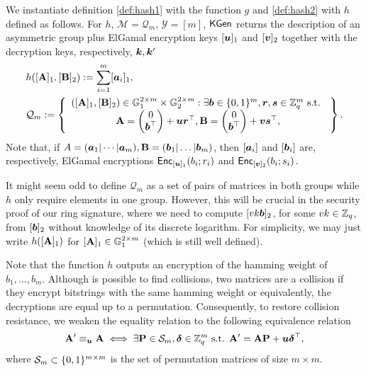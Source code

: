 
We instantiate definition \ref{def:hash1} with the function $g$ and \ref{def:hash2}  with $h$ defined as follows. For  $h$, $\mathcal{M}=\mathcal{Q}_m$, $\mathcal{Y}=[m]$, $\mathsf{KGen}$ returns the description of an asymmetric group plus ElGamal encryption keys $[{\boldsymbol{u}}]_1$  and $[{\boldsymbol{v}}]_2$ together with the decryption keys, respectively, ${\boldsymbol{k}},{\boldsymbol{k}}'$ 
\begin{align*}
&h([\mathbf{{A}}]_1,[\mathbf{{B}}]_2):= \sum_{i=1}^m[{\boldsymbol{a}}_i]_1,\\
&\mathcal{Q}_m := \left\{
\begin{array}{c}
([\mathbf{{A}}]_1,[\mathbf{{B}}]_2) \in \mathbb{G}_1^{2\times m}\times\mathbb{G}_2^{2\times m}:
\exists {\boldsymbol{b}} \in\{0,1\}^m,{\boldsymbol{r}},{\boldsymbol{s}}\in\mathbb{Z}_q^m\text{ s.t. }\\
{\mathbf{{A}} = \left(\begin{matrix}0\\{\boldsymbol{b}}^\top\end{matrix}\right)+{\boldsymbol{u}}{\boldsymbol{r}}^\top, \mathbf{{B}} = \left(\begin{matrix}0\\{\boldsymbol{b}}^\top\end{matrix}\right)+{\boldsymbol{v}}{\boldsymbol{s}}^\top},
\end{array}\right\}.\\
\end{align*}
Note that, if $A=({\boldsymbol{a}}_1|\cdots|{\boldsymbol{a}}_m),\mathbf{{B}}=({\boldsymbol{b}}_1|\ldots|{\boldsymbol{b}}_m)$, then $[{\boldsymbol{a}}_i]$ and $[{\boldsymbol{b}}_i]$ are, respectively, ElGamal encryptions $\mathsf{Enc}_{[{\boldsymbol{u}}]_1}(b_i;r_i)$ and $\mathsf{Enc}_{[{\boldsymbol{v}}]_2}(b_i;s_i)$.

It might seem odd to define $\mathcal{Q}_m$ as a set of pairs of matrices in both groups while $h$ only require elements in one group. However, this will be crucial in the security proof of our ring signature, where we need to compute $[vk {\boldsymbol{b}}]_2$, for some $vk\in\mathbb{Z}_q$,
from  $[{\boldsymbol{b}}]_2$ without knowledge of its discrete logarithm. For simplicity, we may just write $h([\mathbf{{A}}]_1)$ for $[\mathbf{{A}}]_1\in \mathbb{G}_1^{2\times m}$ (which is still well defined).


Note that the function $h$ outputs an encryption of the hamming weight of $b_1,\ldots,b_m$. Although is possible to find collisions, two matrices are a collision if they encrypt bitstrings with the same hamming weight or equivalently, the decryptions are equal up to a permutation. Consequently, to restore collision resistance, we weaken the equality relation to the following equivalence relation
$$
\mathbf{{A}}' \equiv_{\boldsymbol{u}} \mathbf{{A}} \iff \exists \mathbf{{P}}\in\mathcal{S}_m, {\boldsymbol{\delta}}\in\mathbb{Z}_q^m \text{ s.t. } \mathbf{{A}}' = \mathbf{{A}}\mathbf{{P}} + {\boldsymbol{u}}{\boldsymbol{\delta}}^\top,
$$
where $\mathcal{S}_m\subset \{0,1\}^{m\times m}$ is the set of permutation matrices of size $m\times m$.

